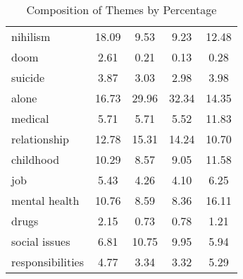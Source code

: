 \documentclass[../report.tex]{subfiles}
\begin{document}
\begin{table*}[ht]
\begin{tabular}{| l | c | c | c | c |}
         \multicolumn{1}{|p{4cm}|}{nihilism} &               18.09 &                 9.53 &                 9.23 &             12.48 \\
             \multicolumn{1}{|p{4cm}|}{doom} &                2.61 &                 0.21 &                 0.13 &              0.28 \\
          \multicolumn{1}{|p{4cm}|}{suicide} &                3.87 &                 3.03 &                 2.98 &              3.98 \\
            \multicolumn{1}{|p{4cm}|}{alone} &               16.73 &                29.96 &                32.34 &             14.35 \\
          \multicolumn{1}{|p{4cm}|}{medical} &                5.71 &                 5.71 &                 5.52 &             11.83 \\
     \multicolumn{1}{|p{4cm}|}{relationship} &               12.78 &                15.31 &                14.24 &             10.70 \\
        \multicolumn{1}{|p{4cm}|}{childhood} &               10.29 &                 8.57 &                 9.05 &             11.58 \\
              \multicolumn{1}{|p{4cm}|}{job} &                5.43 &                 4.26 &                 4.10 &              6.25 \\
    \multicolumn{1}{|p{4cm}|}{mental health} &               10.76 &                 8.59 &                 8.36 &             16.11 \\	           
            \multicolumn{1}{|p{4cm}|}{drugs} &                2.15 &                 0.73 &                 0.78 &              1.21 \\
    \multicolumn{1}{|p{4cm}|}{social issues} &                6.81 &                10.75 &                 9.95 &              5.94 \\
 \multicolumn{1}{|p{4cm}|}{responsibilities} &                4.77 &                 3.34 &                 3.32 &              5.29 \\
			\bottomrule
		\end{tabular}
		\caption{Composition of Themes by Percentage}
		\label{tab:composition}
\end{table*}
\end{document}
